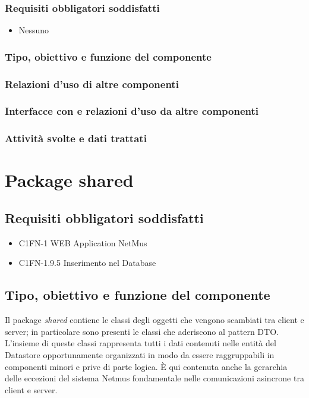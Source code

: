\subsubsection*{Requisiti obbligatori soddisfatti}
\begin{itemize}
    \item Nessuno
\end{itemize}
\subsubsection*{Tipo, obiettivo e funzione del componente}
\subsubsection*{Relazioni d'uso di altre componenti}
\subsubsection*{Interfacce con e relazioni d'uso da altre componenti}
\subsubsection*{Attivit\`a svolte e dati trattati}

\newpage
\section{Package shared}
\subsection*{Requisiti obbligatori soddisfatti}
\begin{itemize}
  	\item C1FN-1 WEB Application NetMus
	\item C1FN-1.9.5 Inserimento nel Database
\end{itemize}
\subsection*{Tipo, obiettivo e funzione del componente}
Il package \emph{shared} contiene le classi degli oggetti che vengono
scambiati tra client e server; in particolare sono presenti le classi che
aderiscono al pattern DTO. L'insieme di queste classi rappresenta tutti i
dati contenuti nelle entit\`a del Datastore opportunamente organizzati in modo
da essere raggruppabili in componenti minori e prive di parte logica.
\`E qui contenuta anche la gerarchia delle eccezioni del sistema Netmus
fondamentale nelle comunicazioni asincrone tra client e server.
